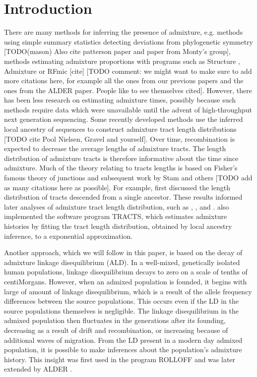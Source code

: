 \begin{table}
\begin{table}
\section*{Introduction} There are many methods for inferring the presence of
admixture, e.g. methods using simple summary statistics detecting deviations
from phylogenetic symmetry \cite{reich2009reconstructing} [TODO(mason) Also cite
patterson paper and paper from Monty's group], methods estimating admixture
proportions with programs such as Structure \cite{pritchard2000inference},
Admixture \cite{alexander2009fast} or RFmic [cite] [TODO comment: we might want
to make sure to add more citations here, for example all the ones from our
previous papers and the ones from the ALDER paper. People like to see themselves
cited]. However, there has been less research on estimating admixture times,
possibly because such methods require data which were unavailable until the
advent of high-throughput next generation sequencing. Some recently developed
methods use the inferred local ancestry of sequences to construct admixture
tract length distributions [TODO cite Pool Nielsen, Gravel and yourself]. Over
time, recombination is expected to decrease the average lengths of admixture
tracts. The length distribution of admixture tracts is therefore informative
about the time since admixture.  Much of the theory relating to tracts lengths
is based on Fisher's famous theory of junctions \cite{fisher1949theory} and
subsequent work by Stam \cite{stam1980distribution} and others [TODO add as many
citations here as possible]. For example, \cite{baird2003distribution} first
discussed the length distribution of tracts descended from a single ancestor.
These results informed later analyses of admixture tract length distribution,
such as \cite{pool2009inference}, \cite{gravel2012population}, and
\cite{liang2014lengths}. \cite{gravel2012population} also implemented the
software program TRACTS, which estimates admixture histories by fitting the
tract length distribution, obtained by local ancestry inference, to a
exponential approximation.

Another approach, which we will follow in this paper, is based on the decay of
admixture linkage disequilibrium (ALD). In a well-mixed, genetically isolated
human populations, linkage disequilibrium decays to zero on a scale of tenths of
centiMorgans. However, when an admixed population is founded, it begins with
large of amount of linkage disequilibrium, which is a result of the allele
frequency differences between the source populations. This occurs even if the LD
in the source populations themselves is negligible. The linkage disequilibrium
in the admixed population then fluctuates in the generations after its founding,
decreasing as a result of drift and recombination, or increasing because of
additional waves of migration. From the LD present in a modern day admixed
population, it is possible to make inferences about the population's admixture
history. This insight was first used in the program ROLLOFF
\cite{moorjani2011history} and was later extended by ALDER
\cite{loh2013inferring}.


\end{table}
\end{table}
